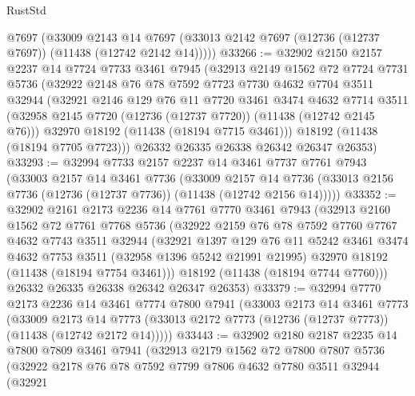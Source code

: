 \begin{lexlean}{RustStd}
\begin{coremodule}
      @7697
      (@33009
        @2143
        @14
        @7697
        (@33013 @2142 @7697 (@12736 (@12737 @7697)) (@11438 (@12742 @2142 @14)))))
@33266 := @32902
    @2150
    @2157
    @2237
    @14
    @7724
    @7733
    @3461
    @7945
    (@32913
      @2149
      @1562
      @72
      @7724
      @7731
      @5736
      (@32922
        @2148
        @76
        @78
        @7592
        @7723
        @7730
        @4632
        @7704
        @3511
        @32944
        (@32921
          @2146
          @129
          @76
          @11
          @7720
          @3461
          @3474
          @4632
          @7714
          @3511
          (@32958 @2145 @7720 (@12736 (@12737 @7720)) (@11438 (@12742 @2145 @76)))
          @32970
          @18192
          (@11438 (@18194 @7715 @3461)))
        @18192
        (@11438 (@18194 @7705 @7723)))
      @26332
      @26335
      @26338
      @26342
      @26347
      @26353)
@33293 := @32994
    @7733
    @2157
    @2237
    @14
    @3461
    @7737
    @7761
    @7943
    (@33003
      @2157
      @14
      @3461
      @7736
      (@33009
        @2157
        @14
        @7736
        (@33013 @2156 @7736 (@12736 (@12737 @7736)) (@11438 (@12742 @2156 @14)))))
@33352 := @32902
    @2161
    @2173
    @2236
    @14
    @7761
    @7770
    @3461
    @7943
    (@32913
      @2160
      @1562
      @72
      @7761
      @7768
      @5736
      (@32922
        @2159
        @76
        @78
        @7592
        @7760
        @7767
        @4632
        @7743
        @3511
        @32944
        (@32921
          @1397
          @129
          @76
          @11
          @5242
          @3461
          @3474
          @4632
          @7753
          @3511
          (@32958 @1396 @5242 @21991 @21995)
          @32970
          @18192
          (@11438 (@18194 @7754 @3461)))
        @18192
        (@11438 (@18194 @7744 @7760)))
      @26332
      @26335
      @26338
      @26342
      @26347
      @26353)
@33379 := @32994
    @7770
    @2173
    @2236
    @14
    @3461
    @7774
    @7800
    @7941
    (@33003
      @2173
      @14
      @3461
      @7773
      (@33009
        @2173
        @14
        @7773
        (@33013 @2172 @7773 (@12736 (@12737 @7773)) (@11438 (@12742 @2172 @14)))))
@33443 := @32902
    @2180
    @2187
    @2235
    @14
    @7800
    @7809
    @3461
    @7941
    (@32913
      @2179
      @1562
      @72
      @7800
      @7807
      @5736
      (@32922
        @2178
        @76
        @78
        @7592
        @7799
        @7806
        @4632
        @7780
        @3511
        @32944
        (@32921

\end{coremodule}
\end{lexlean}
